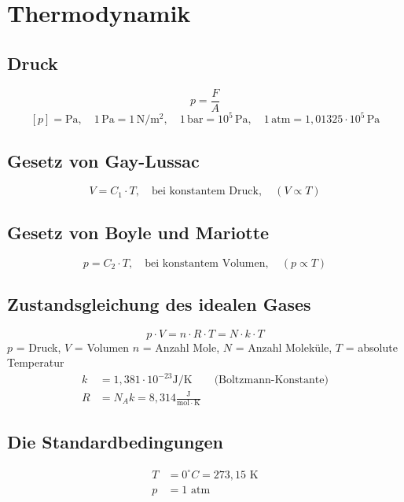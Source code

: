 \section{Thermodynamik}
\subsection{Druck}
\begin{equation}
p = \frac{F}{A} 
\end{equation}
\begin{equation}
\left[ p \right] = \mathrm{Pa}, \quad 1 \, \mathrm{Pa} = 1 \, \mathrm{N} / \mathrm{m^2}, \quad 1 \, \mathrm{bar} = 10^5 \, \mathrm{Pa}, \quad 1 \, \mathrm{atm} = 1,01325 \cdot 10^5 \, \mathrm{Pa}
\end{equation}
\subsection{Gesetz von Gay-Lussac}
\begin{equation}
V = C_1 \cdot T, \quad \text{bei konstantem Druck}, \quad \left( V \propto T \right)
\end{equation}
\subsection{Gesetz von Boyle und Mariotte}
\begin{equation}
p = C_2 \cdot T, \quad \text{bei konstantem Volumen}, \quad \left( p \propto T \right)
\end{equation}
\subsection{Zustandsgleichung des idealen Gases}
\begin{equation}
p \cdot V = n \cdot R \cdot T = N \cdot k \cdot T
\end{equation}
$p$ = Druck, $V$ = Volumen $n$ = Anzahl Mole, $N$ = Anzahl Moleküle, $T$ = absolute Temperatur
\begin{align}
k &= 1,381 \cdot 10^{-23} \mathrm{J / K} \qquad \text{(Boltzmann-Konstante)} \\ 
R &= N_Ak = 8,314 \frac{\mathrm{J}}{\mathrm{mol \cdot K}}
\end{align}
\subsection{Die Standardbedingungen}
\begin{align}
T &= 0^\circ C = 273,15 \text{ K} \\
p &= 1 \text{ atm}
\end{align}
